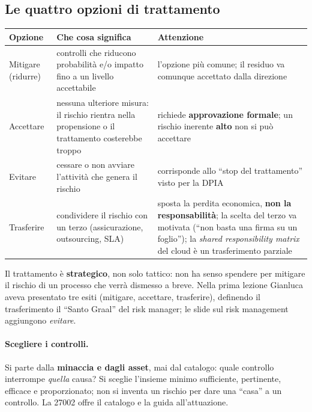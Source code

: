 \subsection{Le quattro opzioni di trattamento}
\begin{center}
\small
\begin{tabularx}{\linewidth}{>{\raggedright\arraybackslash}p{2.3cm} X X}
\toprule
\textbf{Opzione} & \textbf{Che cosa significa} & \textbf{Attenzione}\\
\midrule
Mitigare (ridurre) & controlli che riducono probabilità e/o impatto fino a un livello accettabile &
  l'opzione più comune; il residuo va comunque accettato dalla direzione\\
Accettare & nessuna ulteriore misura: il rischio rientra nella propensione o il trattamento costerebbe
  troppo & richiede \textbf{approvazione formale}; un rischio inerente \textbf{alto} non si può accettare\\
Evitare & cessare o non avviare l'attività che genera il rischio & corrisponde allo ``stop del
  trattamento'' visto per la DPIA\\
Trasferire & condividere il rischio con un terzo (assicurazione, outsourcing, SLA) & sposta la perdita
  economica, \textbf{non la responsabilità}; la scelta del terzo va motivata (``non basta una firma su un
  foglio''); la \emph{shared responsibility matrix} del cloud è un trasferimento parziale\\
\bottomrule
\end{tabularx}
\end{center}
Il trattamento è \textbf{strategico}, non solo tattico: non ha senso spendere per mitigare il rischio di un
processo che verrà dismesso a breve. Nella prima lezione Gianluca aveva presentato tre esiti (mitigare,
accettare, trasferire), definendo il trasferimento il ``Santo Graal'' del risk manager; le slide sul risk
management aggiungono \emph{evitare}.

\paragraph{Scegliere i controlli.} Si parte dalla \textbf{minaccia e dagli asset}, mai dal catalogo: quale
controllo interrompe \emph{quella} causa? Si sceglie l'insieme minimo sufficiente, pertinente, efficace e
proporzionato; non si inventa un rischio per dare una ``casa'' a un controllo. La 27002 offre il catalogo e
la guida all'attuazione.

